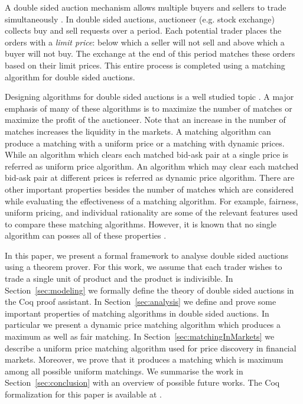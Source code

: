 \documentclass[a4paper,UKenglish,cleveref, autoref]{lipics-v2019}
\begin{document}
A double sided auction mechanism allows multiple buyers and sellers to trade simultaneously \cite{friedman}. In double sided auctions,  auctioneer (e.g. stock exchange) collects buy and sell requests over a period. Each potential trader places the orders with a \emph{limit price}: below which a seller will not sell and above which a buyer will not buy. The exchange at the end of this period matches these orders based on their limit prices. This entire process is completed using a matching algorithm for double sided auctions.  

Designing algorithms for double sided auctions is a well studied topic \cite{mcafee1992, WurmanWW98,NiuP13, ZhaoZKP10}.  A major emphasis of many of these algorithms is to maximize the number of matches or maximize the profit of the auctioneer. Note that an increase in the number of matches increases the liquidity in the markets. A matching algorithm can produce a matching with a uniform price or a matching with dynamic prices. While an algorithm which clears each matched bid-ask pair at a single price is referred as uniform price algorithm.  An algorithm which may clear each matched bid-ask pair at different prices is referred as  dynamic price algorithm. There are other important properties besides the number of matches which are considered while evaluating the effectiveness of a matching algorithm. For example, fairness, uniform pricing, and individual rationality are some of the relevant features used to compare these matching algorithms. However, it is known that no single algorithm can posses all of these properties \cite{WurmanWW98,mcafee1992}. 

In this paper, we present a formal framework to analyse double sided auctions using a theorem prover.  For this work, we assume that each trader wishes to trade a single unit of product and  the product is  indivisible. In Section~\ref{sec:modeling} we formally define the theory of double sided auctions in the Coq proof assistant.  In Section~\ref{sec:analysis} we define and prove some important properties of matching algorithms in double sided auctions. In particular we present a dynamic price matching algorithm which produces a maximum as well as fair matching. In Section~\ref{sec:matchingInMarkets} we describe a uniform price matching algorithm used for price discovery in financial markets. Moreover, we prove that it produces a matching which is maximum among all possible uniform matchings.  We summarise the work in Section~\ref{sec:conclusion}  with an overview of possible future works. The Coq formalization for this paper is available at \cite{auctiongithub}.  
\end{document}
